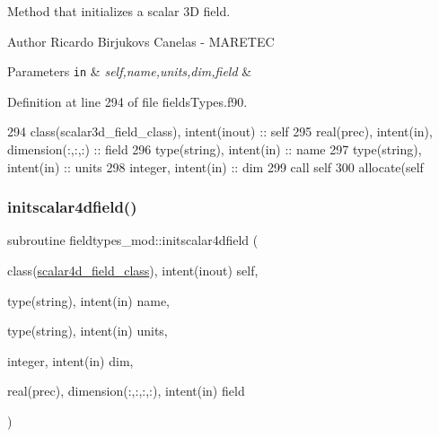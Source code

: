Method that initializes a scalar 3D field. 

\begin{DoxyAuthor}{Author}
Ricardo Birjukovs Canelas -\/ M\+A\+R\+E\+T\+EC 
\end{DoxyAuthor}

\begin{DoxyParams}[1]{Parameters}
\mbox{\tt in}  & {\em self,name,units,dim,field} & \\
\hline
\end{DoxyParams}


Definition at line 294 of file fields\+Types.\+f90.


\begin{DoxyCode}
294     \textcolor{keywordtype}{class}(scalar3d\_field\_class), \textcolor{keywordtype}{intent(inout)} :: self
295     \textcolor{keywordtype}{real(prec)}, \textcolor{keywordtype}{intent(in)}, \textcolor{keywordtype}{dimension(:,:,:)} :: field
296     \textcolor{keywordtype}{type}(string), \textcolor{keywordtype}{intent(in)} :: name
297     \textcolor{keywordtype}{type}(string), \textcolor{keywordtype}{intent(in)} :: units
298     \textcolor{keywordtype}{integer}, \textcolor{keywordtype}{intent(in)} :: dim
299     \textcolor{keyword}{call }self%
300     \textcolor{keyword}{allocate}(self%
\end{DoxyCode}
\mbox{\label{namespacefieldtypes__mod_a21dba84bb8fdb02d8bf5fd0052b51283}} 
\subsubsection{\texorpdfstring{initscalar4dfield()}{initscalar4dfield()}}
{\footnotesize\ttfamily subroutine fieldtypes\+\_\+mod\+::initscalar4dfield (\begin{DoxyParamCaption}\item[{class(\mbox{\hyperlink{structfieldtypes__mod_1_1scalar4d__field__class}{scalar4d\+\_\+field\+\_\+class}}), intent(inout)}]{self,  }\item[{type(string), intent(in)}]{name,  }\item[{type(string), intent(in)}]{units,  }\item[{integer, intent(in)}]{dim,  }\item[{real(prec), dimension(\+:,\+:,\+:,\+:), intent(in)}]{field }\end{DoxyParamCaption})\hspace{0.3cm}{\ttfamily [private]}}



